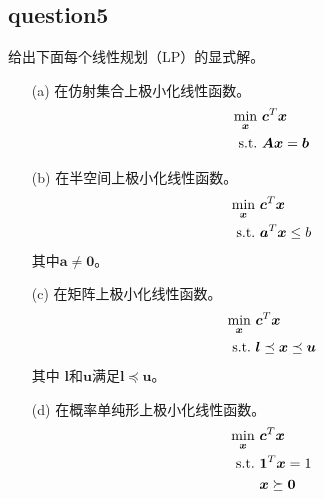 \documentclass[12pt,a4paper]{ctexart}
\begin{document}
\subsection*{question5}
给出下面每个线性规划（LP）的显式解。
\begin{itemize}
    \item[(a)] 在仿射集合上极小化线性函数。
    \begin{align*}
        \min\limits_{\boldsymbol{x}} \ &\boldsymbol{c}^T\boldsymbol{x} \\
        \rm{s.t.}\  &\boldsymbol{Ax}=\boldsymbol{b}
    \end{align*}
    \item[(b)] 在半空间上极小化线性函数。
    \begin{align*}
        \min\limits_{\boldsymbol{x}} \ &\boldsymbol{c}^T\boldsymbol{x} \\
        \rm{s.t.}\  &\boldsymbol{a}^T \boldsymbol{x} \leq b
    \end{align*}
    其中$\boldsymbol{a} \neq \boldsymbol{0}$。
    \item[(c)] 在矩阵上极小化线性函数。
    \begin{align*}
        \min\limits_{\boldsymbol{x}} \ &\boldsymbol{c}^T\boldsymbol{x} \\
        \rm{s.t.}\  &\boldsymbol{l} \preceq \boldsymbol{x} \preceq  \boldsymbol{u}
        \end{align*}
    其中 $\boldsymbol{l}$和$\boldsymbol{u}$满足$\boldsymbol{l} \preceq \boldsymbol{u}$。
    \item[(d)] 在概率单纯形上极小化线性函数。
    \begin{align*}
        \min\limits_{\boldsymbol{x}} \ &\boldsymbol{c}^T\boldsymbol{x} \\
        \rm{s.t.}\  &\boldsymbol{1}^T \boldsymbol{x} =1 \\
                    & \boldsymbol{x}\succeq \boldsymbol{0}
        \end{align*}
\end{itemize}  
\end{document}
